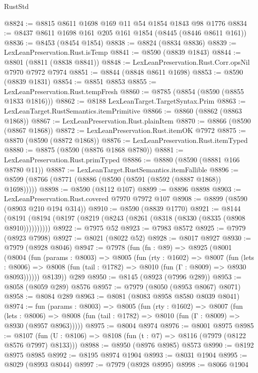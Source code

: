 \begin{lexlean}{RustStd}
\begin{coremodule}
@8824 := @8815 @8611 @1698 @169 @11 @54 @1854 @1843 @98 @1776
@8834 := @8437 @8611 @1698 @161 @205 @161 @1854 (@8445 (@8446 @8611 @161))
@8836 := @8453 (@8454 @1854)
@8838 := @8824 (@8834 @8836)
@8839 := LexLeanPreservation.Rust.isTemp
@8841 := @8590 (@8839 @1843)
@8844 := @8801 (@8811 (@8838 @8841))
@8848 := LexLeanPreservation.Rust.Corr.opsNil @7970 @7972 @7974
@8851 := @8844 (@8848 @8611 @1698)
@8853 := @8590 (@8839 @1831)
@8854 := @8851 @8853
@8855 := LexLeanPreservation.Rust.tempFresh
@8860 := @8785 (@8854 (@8590 (@8855 @1833 @1816)))
@8862 := @8188 LexLeanTarget.TargetSyntax.Prim
@8863 := LexLeanTarget.RustSemantics.itemPrimitive
@8866 := @8860 (@8862 (@8863 @1868))
@8867 := LexLeanPreservation.Rust.plainItem
@8870 := @8866 (@8590 (@8867 @1868))
@8872 := LexLeanPreservation.Rust.itemOK @7972
@8875 := @8870 (@8590 (@8872 @1868))
@8876 := LexLeanPreservation.Rust.itemTyped
@8880 := @8875 (@8590 (@8876 @1868 @8780))
@8881 := LexLeanPreservation.Rust.primTyped
@8886 := @8880 (@8590 (@8881 @166 @8780 @11))
@8887 := LexLeanTarget.RustSemantics.itemFallible
@8896 := @8599 (@8766 (@8771 (@8886 (@8590 (@8591 (@8592 (@8887 @1868)) @1698)))))
@8898 := @8590 (@8112 @107)
@8899 := @8896 @8898
@8903 := LexLeanPreservation.Rust.covered @7970 @7972 @107
@8908 := @8899 (@8590 (@8903 @210 @194 @314))
@8910 := @8590 (@8839 @1770)
@8921 := @8144 (@8191 (@8194 (@8197 (@8219 (@8243 (@8261 (@8318 (@8330 (@8335 (@8908 @8910))))))))))
@8922 := @7975 @52
@8923 := @7983 @8572
@8925 := @7979 (@8923 @7998)
@8927 := @8021 (@8022 @52)
@8928 := @8017 @8927
@8930 := @7979 (@8928 @8046)
@8947 := @7978
    (fun (fn : @89) =>
    @8925
      (@8001
        (@8004
          (fun (params : @8003) =>
          @8005
            (fun (rty : @1602) =>
            @8007
              (fun (lets : @8006) =>
              @8008 (fun (tail : @1782) => @8010 (fun (Γ : @8009) => @8930 @8093))))))
        @8139))
    @289
@8950 := @8145 (@8923 (@7996 @289))
@8953 := @8058 (@8059 @289) @8576
@8957 := @7979 (@8050 (@8953 @8067) @8071)
@8958 := @8084 @289
@8963 := @8081 (@8083 @8958 @8580 @8039 @8041)
@8974 := fun (params : @8003) =>
  @8005
    (fun (rty : @1602) =>
    @8007
      (fun (lets : @8006) =>
      @8008 (fun (tail : @1782) => @8010 (fun (Γ : @8009) => @8930 (@8957 @8963)))))
@8975 := @8004 @8974
@8976 := @8001 @8975
@8985 := @8107 (fun (U : @8106) => @8108 (fun (t : @7) => @8116 (@7979 (@8122 @8576 @7997) @8133)))
@8988 := @8950 (@8976 @8985) @8573
@8990 := @8192 @8975 @8985
@8992 := @8195 @8974 @1904
@8993 := @8031 @1904
@8995 := @8029 (@8993 @8044)
@8997 := @7979 (@8928 @8995)
@8998 := @8066 @1904

\end{coremodule}
\end{lexlean}
